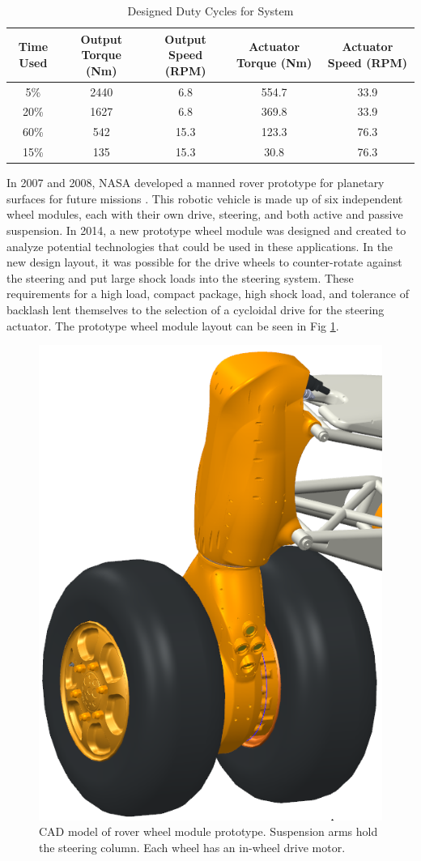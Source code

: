 \begin{table}[t]
\caption{Designed Duty Cycles for System}
\label{duty_cycle}
\begin{center}
\begin{tabular}{|c||c||c| |c| |c|}
\hline
Time Used & Output Torque (Nm) & Output Speed (RPM) & Actuator Torque (Nm) & Actuator Speed (RPM)\\
\hline
5\% & 2440 & 6.8 & 554.7 & 33.9\\
\hline
20\% & 1627 & 6.8 & 369.8 & 33.9\\
\hline
60\% & 542 & 15.3 & 123.3 & 76.3\\
\hline
15\% & 135 & 15.3 & 30.8 & 76.3\\
\hline
\end{tabular}
\end{center}
\end{table}


   
In 2007 and 2008, NASA developed a manned rover prototype for planetary surfaces for future missions \cite{rover}. This robotic vehicle is made up of six independent wheel modules, each with their own drive, steering, and both active and passive suspension. In 2014, a new prototype wheel module was designed and created to analyze potential technologies that could be used in these applications. In the new design layout, it was possible for the drive wheels to counter-rotate against the steering and put large shock loads into the steering system. These requirements for a high load, compact package, high shock load, and tolerance of backlash lent themselves to the selection of a cycloidal drive for the steering actuator. The prototype wheel module layout can be seen in Fig \ref{wheel_module}.

   \begin{figure}[t]
      \centering
      \includegraphics[width=0.40\linewidth]{images/wheel_module_CAD}
      \caption{CAD model of rover wheel module prototype. Suspension arms hold the steering column. Each wheel has an in-wheel drive motor.}
      \label{wheel_module}
   \end{figure}
   
